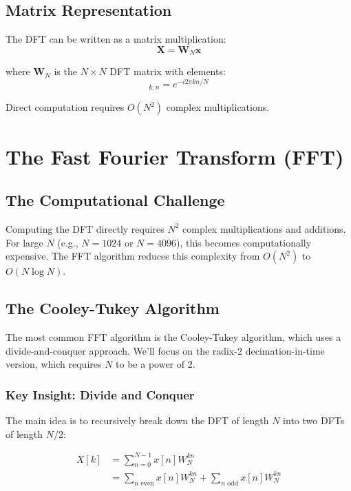 \documentclass[11pt,a4paper]{article}
\begin{document}
\subsection{Matrix Representation}

The DFT can be written as a matrix multiplication:
\begin{equation}
\mathbf{X} = \mathbf{W}_N \mathbf{x}
\end{equation}

where $\mathbf{W}_N$ is the $N \times N$ DFT matrix with elements:
\begin{equation}
[\mathbf{W}_N]_{k,n} = e^{-i 2\pi k n / N}
\end{equation}

Direct computation requires $O(N^2)$ complex multiplications.

\section{The Fast Fourier Transform (FFT)}

\subsection{The Computational Challenge}

Computing the DFT directly requires $N^2$ complex multiplications and additions. For large $N$ (e.g., $N = 1024$ or $N = 4096$), this becomes computationally expensive. The FFT algorithm reduces this complexity from $O(N^2)$ to $O(N \log N)$.

\subsection{The Cooley-Tukey Algorithm}

The most common FFT algorithm is the Cooley-Tukey algorithm, which uses a divide-and-conquer approach. We'll focus on the radix-2 decimation-in-time version, which requires $N$ to be a power of 2.

\subsubsection{Key Insight: Divide and Conquer}

The main idea is to recursively break down the DFT of length $N$ into two DFTs of length $N/2$:

\begin{align}
X[k] &= \sum_{n=0}^{N-1} x[n] W_N^{kn} \\
&= \sum_{n \text{ even}} x[n] W_N^{kn} + \sum_{n \text{ odd}} x[n] W_N^{kn}
\end{align}
\end{document}

